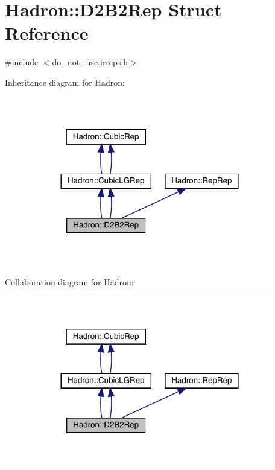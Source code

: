 \hypertarget{structHadron_1_1D2B2Rep}{}\section{Hadron\+:\+:D2\+B2\+Rep Struct Reference}
\label{structHadron_1_1D2B2Rep}


{\ttfamily \#include $<$do\+\_\+not\+\_\+use.\+irreps.\+h$>$}



Inheritance diagram for Hadron\+:\nopagebreak
\begin{figure}[H]
\begin{center}
\leavevmode
\includegraphics[width=300pt]{d3/d59/structHadron_1_1D2B2Rep__inherit__graph}
\end{center}
\end{figure}


Collaboration diagram for Hadron\+:\nopagebreak
\begin{figure}[H]
\begin{center}
\leavevmode
\includegraphics[width=300pt]{d9/df8/structHadron_1_1D2B2Rep__coll__graph}
\end{center}
\end{figure}
